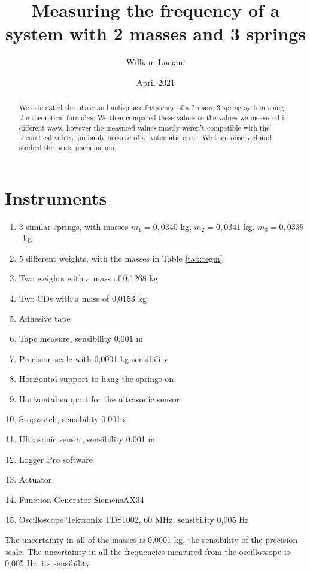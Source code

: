 \documentclass{article}
\title{ Measuring the frequency  of a system with 2 masses and 3 springs}
\author{William Luciani}
\date{April 2021}
\begin{document}
\maketitle

\begin{abstract}
    We calculated the phase and anti-phase frequency of a 2 mass, 3 spring system using the theoretical formulas. We then compared these values to the values we measured in different ways, however the measured values mostly weren't compatible with the theoretical values, probably because of a systematic error. We then observed and studied the beats phenomenon.
\end{abstract}

\section{Instruments} \label{sec:instr}

\begin{enumerate}
    \item 3 similar springs, with masses $m_1 = 0,0340$ kg, $m_2 = 0,0341$ kg, \hbox{$m_3 = 0,0339$ kg}
    \item 5 different weights, with the masses in Table \ref{tab:regm}
    \item Two weights with a mass of 0,1268 kg
    \item Two CDs with a mass of 0,0153 kg          %
    \item Adhesive tape
    \item Tape measure, sensibility 0,001 m
    \item Precision scale with 0,0001 kg sensibility
    \item Horizontal support to hang the springs on
    \item Horizontal support for the ultrasonic sensor
    \item Stopwatch, sensibility 0,001 s
    \item Ultrasonic sensor, sensibility 0,001 m
    \item Logger Pro software
    \item Actuator
    \item Function Generator SiemensAX34
    \item Oscilloscope Tektronix TDS1002, 60 MHz, sensibility 0,005 Hz
\end{enumerate}

The uncertainty in all of the masses is 0,0001 kg, the sensibility of the precision scale. The uncertainty in all the frequencies measured from the oscilloscope is 0,005 Hz, its sensibility.
\end{document}
